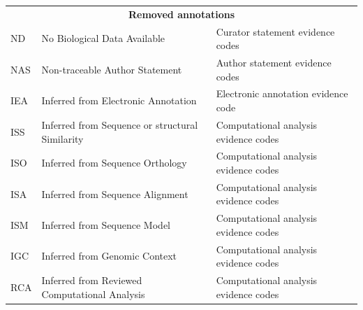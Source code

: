 \documentclass[ijms,article,submit,moreauthors,pdftex]{Definitions/mdpi}
\begin{document}
\begin{table}[h!]
{\begin{tabular}{lll}
\multicolumn{3}{c}{\textbf{Removed annotations}}                                                                                                                                                \\
\rowcolor[HTML]{C0C0C0} 
ND                                                               & No Biological Data Available                                  & Curator statement evidence codes                             \\
NAS                                                              & Non-traceable Author Statement                                & Author statement evidence codes                              \\
\rowcolor[HTML]{C0C0C0} 
IEA                                                              & Inferred from Electronic Annotation                           & Electronic annotation evidence code                          \\
ISS                                                              & Inferred from Sequence or structural Similarity               & Computational analysis evidence codes                        \\
\rowcolor[HTML]{C0C0C0} 
ISO                                                              & Inferred from Sequence Orthology                              & Computational analysis evidence codes                        \\
ISA                                                              & Inferred from Sequence Alignment                              & Computational analysis evidence codes                        \\
\rowcolor[HTML]{C0C0C0} 
ISM                                                              & Inferred from Sequence Model                                  & Computational analysis evidence codes                        \\
IGC                                                              & Inferred from Genomic Context                                 & Computational analysis evidence codes                        \\
\rowcolor[HTML]{C0C0C0} 
RCA                                                              & Inferred from Reviewed Computational Analysis & Computational analysis evidence codes
\end{tabular}%
}
\end{table}


\end{document}
